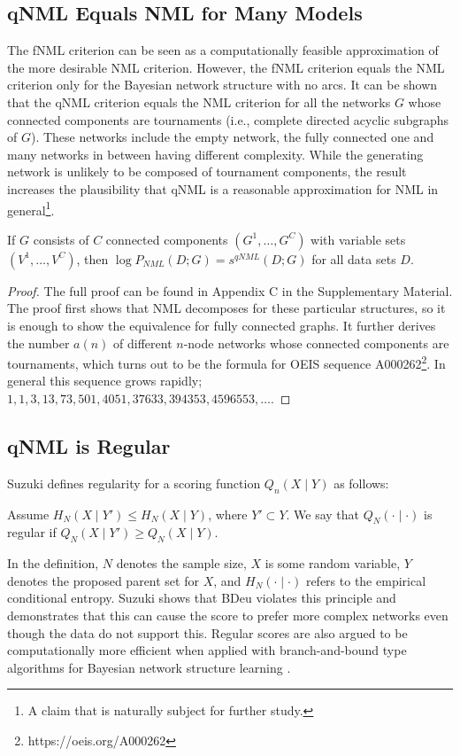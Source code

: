 \subsection{qNML Equals NML for Many Models}
The fNML criterion can be seen as a computationally feasible
approximation of the more desirable NML criterion.  However, the fNML
criterion equals the NML criterion only for the Bayesian network
structure with no arcs.  It can be shown that the qNML criterion
equals the NML criterion for all the networks $G$ whose connected
components are tournaments (i.e., complete directed acyclic subgraphs of
$G$). These networks include the empty network, the fully connected
one and many networks in between having different complexity. While
the generating network is unlikely to be composed of tournament
components, the result increases the plausibility that qNML is a
reasonable approximation for NML in general\footnote{A claim that is
  naturally subject for further study.}.

\begin{theorem}
If $G$ consists of $C$ connected components $(G^1,\ldots,G^C)$ with
variable sets $(V^1,\ldots,V^C)$, then $\log P_{NML}(D;G) = s^{qNML}(D;G)$
for all data sets $D$.
\end{theorem}
\begin{proof}
The full proof can be found in Appendix C in the Supplementary
Material.  The proof first shows that NML decomposes for these
particular structures, so it is enough to show the equivalence for
fully connected graphs.
It further derives the number $a(n)$ of
different $n$-node networks whose connected components are
tournaments, which turns out to be the formula for OEIS sequence
A000262\footnote{https://oeis.org/A000262}.
In general this sequence grows rapidly; $1, 1, 3, 13, 73, 501, 4051,
37633, 394353, 4596553, \ldots$.
\end{proof}

\subsection{qNML is Regular}\label{sec:regularity}

Suzuki \cite{Suzuki2017} defines regularity for a scoring function $Q_n(X \mid Y)$ as follows:
\begin{definition}
Assume $H_N(X \mid Y') \leq H_N(X \mid Y)$, where $Y' \subset Y.$ We say that $Q_N(\cdot \mid \cdot)$ is regular if $Q_N(X \mid Y') \geq Q_N(X \mid Y)$.
\end{definition}
In the definition, $N$ denotes the sample size, $X$ is some random variable, $Y$ denotes the proposed parent set for $X$, and $H_N(\cdot \mid \cdot)$ refers to the empirical conditional entropy. Suzuki \cite{Suzuki2017} shows that BDeu violates this principle and demonstrates that this can cause the score to prefer more complex networks even though the data do not support this. Regular scores are also argued to be computationally more efficient when applied with branch-and-bound type algorithms for Bayesian network structure learning \cite{Suzuki2017_2}. 

